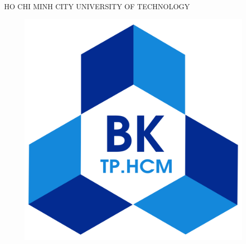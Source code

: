 \documentclass[11pt]{article}
\begin{document}

\begin{titlepage} %
	\newcommand{\HRule}{\rule{\linewidth}{0.5mm}} %
	
	\center %
	
	
	\textsc{\LARGE HO CHI MINH CITY UNIVERSITY OF TECHNOLOGY}\\[0.25cm] %

	\begin{figure}[ht]
		\begin{center}
			
			\includegraphics[scale=0.12]{logobk.png}\\
	
		\end{center}
		

\end{figure}
\end{titlepage}
\end{document}
